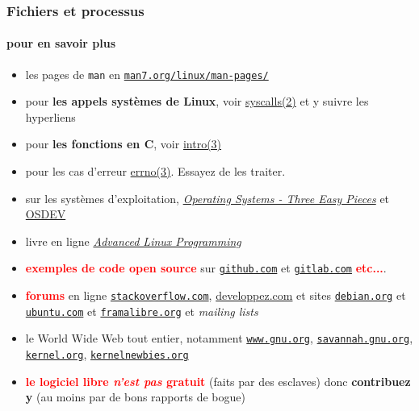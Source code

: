 \documentclass[xcolor=svgnames,final,smaller,a4]{beamer}
\begin{document}
\begin{frame}
  \frametitle{Fichiers et processus}
  \framesubtitle{pour en savoir plus}

  \begin{relsize}{-1}
  \begin{itemize}

  \item les pages de \texttt{man} en \href{https://man7.org/linux/man-pages/}{\texttt{man7.org/linux/man-pages/}}

  \item pour \textbf{les appels systèmes de Linux}, voir 
    \href{https://man7.org/linux/man-pages/man2/syscalls.2.html}{syscalls(2)} et y suivre les hyperliens

  \item pour \textbf{les fonctions en C}, voir 
    \href{https://man7.org/linux/man-pages/man3/intro.3.html}{intro(3)}

    
  \item pour les cas d'erreur
    \href{https://man7.org/linux/man-pages/man3/errno.3.html}{errno(3)}. Essayez
    de les traiter.

  \item sur les systèmes d'exploitation, \href{http://pages.cs.wisc.edu/~remzi/OSTEP/}{\textit{Operating Systems - Three Easy Pieces}} et \href{https://osdev.org/}{OSDEV}

  \item livre en ligne \href{https://mentorembedded.github.io/advancedlinuxprogramming/}{\textit{Advanced Linux Programming}}

  \item \textcolor{red}{\textbf{exemples de code open source}} sur \href{https://github.com/}{\texttt{github.com}} et \href{https://gitlab.com}{\texttt{gitlab.com}}  \textcolor{red}{\textbf{etc...}}.

    \item \textcolor{red}{\textbf{forums}} en ligne
      \href{https://stackoverflow.com}{\texttt{stackoverflow.com}},
      \href{https://www.developpez.com/}{developpez.com} et sites \href{https://debian.org}{\texttt{debian.org}} et \href{https://ubuntu.com}{\texttt{ubuntu.com}} et \href{https://framalibre.org/}{\texttt{framalibre.org}} et \textit{mailing lists}

    \item le World Wide Web tout entier, notamment \href{https://www.gnu.org/}{\texttt{www.gnu.org}}, \href{https://savannah.gnu.org/}{\texttt{savannah.gnu.org}}, \href{http://kernel.org/}{\texttt{kernel.org}}, \href{https://kernelnewbies.org}{\texttt{kernelnewbies.org}} 


      \item  \textcolor{red}{\textbf{le logiciel libre \textit{n'est pas} gratuit}} (faits par des esclaves) donc \textbf{contribuez y} (au moins par de bons rapports de bogue)
  \end{itemize}
  \end{relsize}
  
\end{frame}
\end{document}
